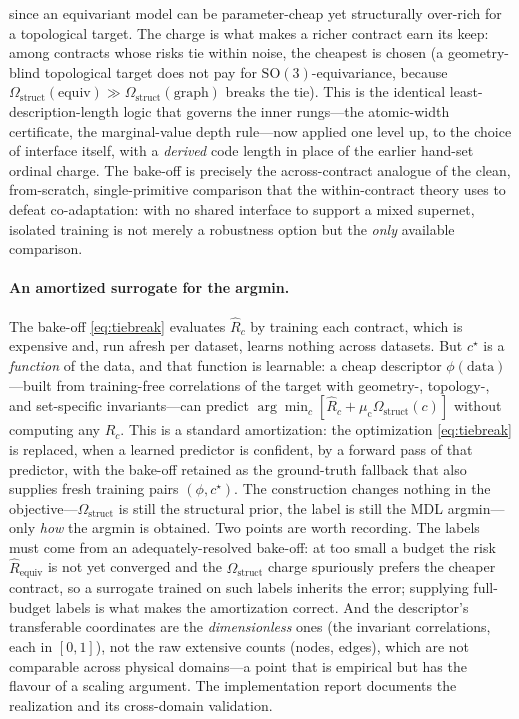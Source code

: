 \documentclass[11pt]{article}
\theoremstyle{definition}
\begin{document}
since an equivariant model can be parameter-cheap yet structurally over-rich for a topological target. The
charge is what makes a richer contract earn its keep: among contracts whose risks tie within noise, the
cheapest is chosen (a geometry-blind topological target does not pay for $\mathrm{SO}(3)$-equivariance,
because $\Omega_{\mathrm{struct}}(\text{equiv})\gg\Omega_{\mathrm{struct}}(\text{graph})$ breaks the tie).
This is the identical least-description-length logic that governs the inner rungs---the atomic-width
certificate, the marginal-value depth rule---now applied one level up, to the choice of interface itself,
with a \emph{derived} code length in place of the earlier hand-set ordinal charge. The
bake-off is precisely the across-contract analogue of the clean, from-scratch, single-primitive
comparison that the within-contract theory uses to defeat co-adaptation: with no shared interface to
support a mixed supernet, isolated training is not merely a robustness option but the \emph{only}
available comparison.

\paragraph{An amortized surrogate for the argmin.} The bake-off \eqref{eq:tiebreak} evaluates
$\widehat R_c$ by training each contract, which is expensive and, run afresh per dataset, learns nothing
across datasets. But $c^\star$ is a \emph{function} of the data, and that function is learnable: a cheap
descriptor $\phi(\text{data})$---built from training-free correlations of the target with geometry-,
topology-, and set-specific invariants---can predict $\arg\min_c[\widehat R_c+\mu_{\mathrm c}
\Omega_{\mathrm{struct}}(c)]$ without computing any $\widehat R_c$. This is a standard amortization: the
optimization \eqref{eq:tiebreak} is replaced, when a learned predictor is confident, by a forward pass of
that predictor, with the bake-off retained as the ground-truth fallback that also supplies fresh training
pairs $(\phi,c^\star)$. The construction changes nothing in the objective---$\Omega_{\mathrm{struct}}$ is
still the structural prior, the label is still the MDL argmin---only \emph{how} the argmin is obtained.
Two points are worth recording. The labels must come from an adequately-resolved bake-off: at too small a
budget the risk $\widehat R_{\text{equiv}}$ is not yet converged and the $\Omega_{\mathrm{struct}}$ charge
spuriously prefers the cheaper contract, so a surrogate trained on such labels inherits the error;
supplying full-budget labels is what makes the amortization correct. And the descriptor's transferable
coordinates are the \emph{dimensionless} ones (the invariant correlations, each in $[0,1]$), not the raw
extensive counts (nodes, edges), which are not comparable across physical domains---a point that is
empirical but has the flavour of a scaling argument. The implementation report documents the realization
and its cross-domain validation.
\end{document}

